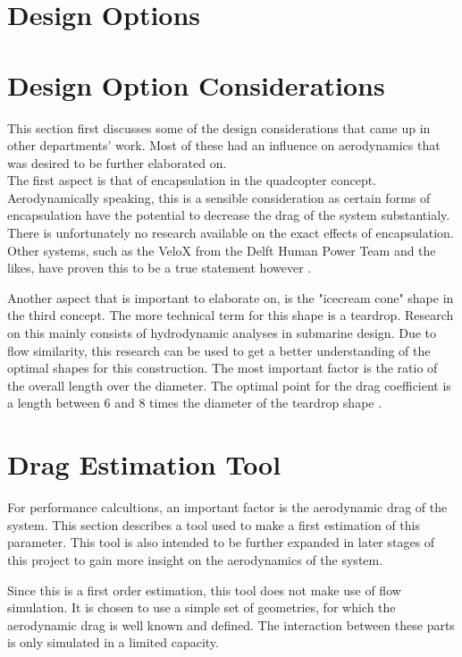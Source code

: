 \section{Design Options}



\section{Design Option Considerations}
This section first discusses some of the design considerations that came up in other departments' work. Most of these had an influence on aerodynamics that was desired to be further elaborated on.\\

\noindent The first aspect is that of encapsulation in the quadcopter concept. Aerodynamically speaking, this is a sensible consideration as certain forms of encapsulation have the potential to decrease the drag of the system substantialy. There is unfortunately no research available on the exact effects of encapsulation. Other systems, such as the VeloX from the Delft Human Power Team and the likes, have proven this to be a true statement however .\par
Another aspect that is important to elaborate on, is the "icecream cone" shape in the third concept. The more technical term for this shape is a teardrop. Research on this mainly consists of hydrodynamic analyses in submarine design. Due to flow similarity, this research can be used to get a better understanding of the optimal shapes for this construction. The most important factor is the ratio of the overall length over the diameter. The optimal point for the drag coefficient is a length between 6 and 8 times the diameter of the teardrop shape \cite{ConeFlow2}.\par


\section{Drag Estimation Tool}
For performance calcultions, an important factor is the aerodynamic drag of the system. This section describes a tool used to make a first estimation of this parameter. This tool is also intended to be further expanded in later stages of this project to gain more insight on the aerodynamics of the system.\par
Since this is a first order estimation, this tool does not make use of flow simulation. It is chosen to use a simple set of geometries, for which the aerodynamic drag is well known and defined. The interaction between these parts is only simulated in a limited capacity.\\

